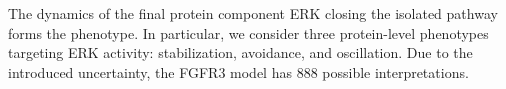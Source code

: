 The dynamics of the final protein component ERK closing the isolated pathway forms the phenotype. In particular, we consider three protein-level phenotypes targeting ERK activity:  stabilization,  avoidance, and  oscillation. Due to the introduced uncertainty, the FGFR3 model has 888 possible interpretations. 




